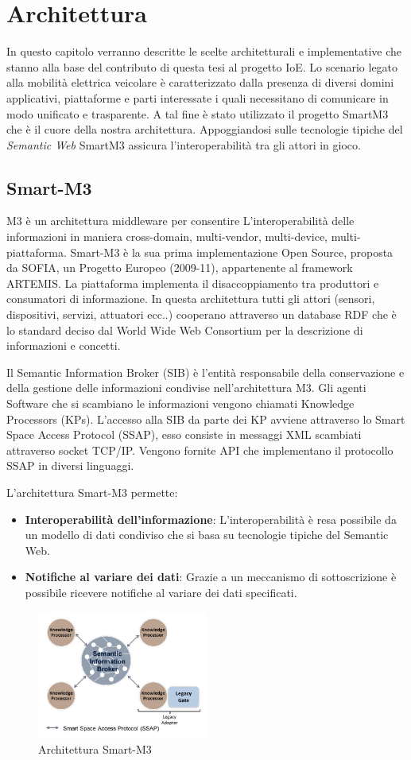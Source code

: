 \chapter{Architettura}

In questo capitolo verranno descritte le scelte architetturali e implementative che stanno alla base del contributo di questa tesi al progetto IoE. 
Lo scenario legato alla mobilità elettrica veicolare è caratterizzato dalla presenza di diversi domini applicativi, piattaforme e parti interessate i quali necessitano di comunicare in modo unificato e trasparente. A tal fine è stato utilizzato il progetto SmartM3 ~\cite{tullio2011} che è il cuore della nostra architettura. Appoggiandosi sulle tecnologie tipiche del \emph{Semantic Web} SmartM3 assicura l'interoperabilità tra gli attori in gioco. 

\section{Smart-M3}

M3 è un architettura middleware per consentire L'interoperabilità delle informazioni in maniera cross-domain, multi-vendor, multi-device, multi-piattaforma. Smart-M3 è la sua prima implementazione Open Source, proposta da SOFIA, un Progetto Europeo (2009-11), appartenente al framework ARTEMIS. 
La piattaforma implementa il disaccoppiamento tra produttori e consumatori di informazione. In questa architettura tutti gli attori (sensori, dispositivi, servizi, attuatori ecc..) cooperano attraverso un database RDF che è lo standard deciso dal World Wide Web Consortium per la descrizione di informazioni e concetti.

Il Semantic Information Broker (SIB) è l'entità responsabile della conservazione e della gestione delle informazioni condivise nell'architettura M3. Gli agenti Software che si scambiano le informazioni vengono chiamati Knowledge Processors (KPs). L'accesso alla SIB da parte dei KP avviene attraverso lo Smart Space Access Protocol  (SSAP), esso consiste in messaggi XML scambiati attraverso socket TCP/IP. Vengono fornite API che implementano il protocollo SSAP in diversi linguaggi.

L'architettura Smart-M3 permette:

\begin{itemize}
	\item \textbf{Interoperabilità dell'informazione}: L'interoperabilità è resa possibile da un modello di dati condiviso che si basa su tecnologie tipiche del Semantic Web.
	\item \textbf{Notifiche al variare dei dati}: Grazie a un meccanismo di sottoscrizione è possibile ricevere notifiche al variare dei dati specificati.
\end{itemize}

\begin{figure}[H]
	\centering
	\includegraphics[width=0.5\textwidth]{assets/smart-m3.jpg}
	\caption{Architettura Smart-M3}
	\label{fig:smart-m3}
\end{figure}